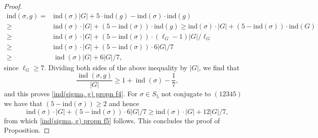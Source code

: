 \documentclass[10pt,a4paper]{amsart}
\newcommand{\ind}{\mathrm{ind}}
\newcommand{\op}[1]{\operatorname{#1}}
\begin{document}
\begin{proof}
\[\begin{split}
    \ind(\sigma, g) = & \ind(\sigma)|G| + 5\cdot\ind(g) - \ind(\sigma)\cdot\ind(g) \\
   \geq  & \ind(\sigma)\cdot|G| + (5-\ind(\sigma))\cdot\ind(g) \geq \ind(\sigma)\cdot |G| + (5-\ind(\sigma))\cdot \ind(G) \\
   \geq  & \ind(\sigma)\cdot |G| + (5-\ind(\sigma))\cdot (\ell_G-1)|G|/\ell_G \\
   \geq & \ind(\sigma)\cdot |G| + (5-\ind(\sigma))\cdot 6|G|/7 \\
   \geq & \op{ind}(\sigma) |G|+6|G|/7,
\end{split} \] since $\ell_G \geq 7$. Dividing both sides of the above inequality by $|G|$, we find that 
\[\frac{\op{ind}(\sigma, g)}{|G|}\geq 1+\op{ind}(\sigma) -\frac{1}{7},\] and this proves \eqref{ind(sigma, g) propn f4}. 
For $\sigma \in S_5$ not conjugate to $(12345)$ we have that $(5-\ind(\sigma))\geq 2$ and hence \[\ind(\sigma)\cdot |G| + (5-\ind(\sigma))\cdot 6|G|/7 \geq \ind(\sigma)\cdot |G| + 12|G|/7,\] from which \eqref{ind(sigma, g) propn f5} follows. This concludes the proof of Proposition.
\end{proof}
\end{document}
